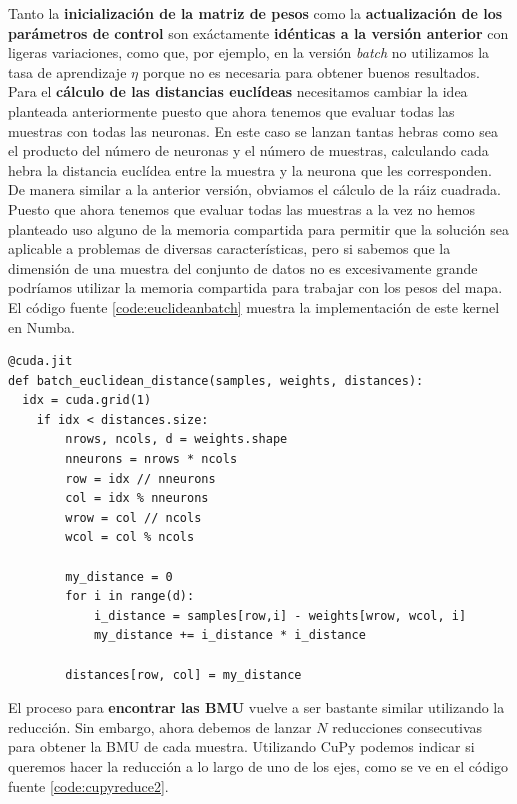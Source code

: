 Tanto la \textbf{inicialización de la matriz de pesos} como la \textbf{actualización de los parámetros de control} son exáctamente \textbf{idénticas a la versión anterior} con ligeras variaciones, como que, por ejemplo, en la versión \textit{batch} no utilizamos la tasa de aprendizaje $\eta$ porque no es necesaria para obtener buenos resultados.\\

Para el \textbf{cálculo de las distancias euclídeas} necesitamos cambiar la idea planteada anteriormente puesto que ahora tenemos que evaluar todas las muestras con todas las neuronas. 
En este caso se lanzan tantas hebras como sea el producto del número de neuronas y el número de muestras, calculando cada hebra la distancia euclídea entre la muestra y la neurona que les corresponden. De manera similar a la anterior versión, obviamos el cálculo de la ráiz cuadrada. Puesto que ahora tenemos que evaluar todas las muestras a la vez no hemos planteado uso alguno de la memoria compartida para permitir que la solución sea aplicable a problemas de diversas características, pero si sabemos que la dimensión de una muestra del conjunto de datos no es excesivamente grande podríamos utilizar la memoria compartida para trabajar con los pesos del mapa. El código fuente \ref{code:euclideanbatch} muestra la implementación de este kernel en Numba.

\begin{code}
\begin{verbatim}
@cuda.jit
def batch_euclidean_distance(samples, weights, distances):
  idx = cuda.grid(1)
    if idx < distances.size:
        nrows, ncols, d = weights.shape
        nneurons = nrows * ncols
        row = idx // nneurons
        col = idx % nneurons
        wrow = col // ncols
        wcol = col % ncols

        my_distance = 0
        for i in range(d):
            i_distance = samples[row,i] - weights[wrow, wcol, i]
            my_distance += i_distance * i_distance
            
        distances[row, col] = my_distance
\end{verbatim}
\label{code:euclideanbatch}
\end{code}

El proceso para \textbf{encontrar las BMU} vuelve a ser bastante similar utilizando la reducción. Sin embargo, ahora debemos de lanzar $N$ reducciones consecutivas para obtener la BMU de cada muestra. Utilizando CuPy podemos indicar si queremos hacer la reducción a lo largo de uno de los ejes, como se ve en el código fuente \ref{code:cupyreduce2}.

